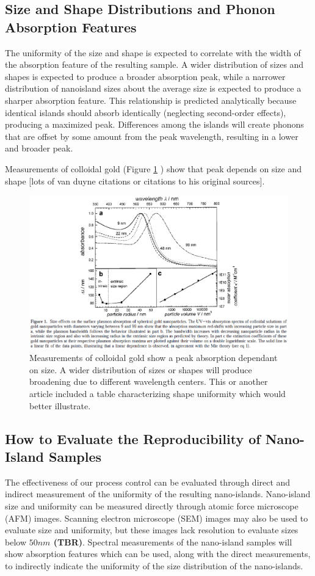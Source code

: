 \documentclass[12pt,oneside,english]{article}
\begin{document}
	\subsection{Size and Shape Distributions and Phonon Absorption Features}
	The uniformity of the size and shape is expected to correlate with the width of the absorption feature of the resulting sample.
	A wider distribution of sizes and shapes is expected to produce a broader absorption peak, while a narrower distribution of nanoisland sizes about the average size is expected to produce a sharper absorption feature.
	This relationship is predicted analytically because identical islands should absorb identically (neglecting second-order effects), producing a maximized peak.  
	Differences among the islands will create phonons that are offset by some amount from the peak wavelength, resulting in a lower and broader peak.

	Measurements of colloidal gold (Figure \ref{f:link99} \cite{link99}) show that peak depends on size and shape [lots of van duyne citations or citations to his original sources].
	
	\begin{figure}
		\includegraphics[width=150mm]{images/link99.eps}
		\caption{Measurements of colloidal gold show a peak absorption dependant on size.  A wider distribution of sizes or shapes will produce broadening due to different wavelength centers.  This or another article included a table characterizing shape uniformity which would better illustrate.}
		\label{f:link99}
	\end{figure}
		

	\subsection{How to Evaluate the Reproducibility of Nano-Island Samples}
	The effectiveness of our process control can be evaluated through direct and indirect measurement of the uniformity of the resulting nano-islands.  
	Nano-island size and uniformity can be measured directly through atomic force microscope (AFM) images.  
	Scanning electron microscope (SEM) images may also be used to evaluate size and uniformity, but these images lack resolution to evaluate sizes below {\bf $50nm$ (TBR)}.  
	Spectral measurements of the nano-island samples will show absorption features which can be used, along with the direct measurements, to indirectly indicate the uniformity of the size distribution of the nano-islands.
	
\end{document}
